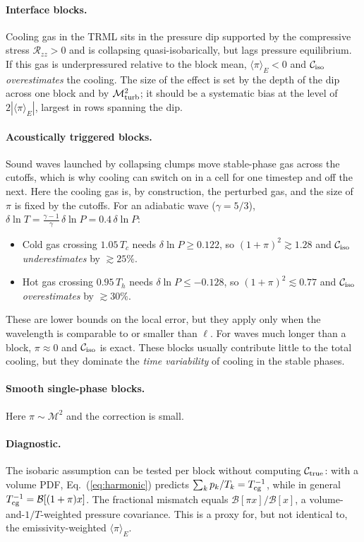 \documentclass[11pt]{article}
\newcommand{\B}{\mathcal{B}}
\newcommand{\Ctrue}{\mathcal{C}_{\rm true}}
\newcommand{\Ciso}{\mathcal{C}_{\rm iso}}
\newcommand{\Tcg}{T_{\rm cg}}
\begin{document}
\paragraph{Interface blocks.} Cooling gas in the TRML sits in the pressure dip supported by the compressive stress $\mathcal R_{zz}>0$ and is collapsing quasi-isobarically, but lags pressure equilibrium. If this gas is underpressured relative to the block mean, $\langle\pi\rangle_E<0$ and $\Ciso$ \emph{overestimates} the cooling. The size of the effect is set by the depth of the dip across one block and by $\mathcal M_{\rm turb}^2$; it should be a systematic bias at the level of $2|\langle\pi\rangle_E|$, largest in rows spanning the dip.

\paragraph{Acoustically triggered blocks.} Sound waves launched by collapsing clumps move stable-phase gas across the cutoffs, which is why cooling can switch on in a cell for one timestep and off the next. Here the cooling gas is, by construction, the perturbed gas, and the size of $\pi$ is fixed by the cutoffs. For an adiabatic wave ($\gamma=5/3$), $\delta\ln T=\tfrac{\gamma-1}{\gamma}\,\delta\ln P=0.4\,\delta\ln P$:
\begin{itemize}
\item Cold gas crossing $1.05\,T_c$ needs $\delta\ln P\ge0.122$, so $(1+\pi)^2\gtrsim1.28$ and $\Ciso$ \emph{underestimates} by $\gtrsim25\%$.
\item Hot gas crossing $0.95\,T_h$ needs $\delta\ln P\le-0.128$, so $(1+\pi)^2\lesssim0.77$ and $\Ciso$ \emph{overestimates} by $\gtrsim30\%$.
\end{itemize}
These are lower bounds on the local error, but they apply only when the wavelength is comparable to or smaller than $\ell$. For waves much longer than a block, $\pi\approx0$ and $\Ciso$ is exact. These blocks usually contribute little to the total cooling, but they dominate the \emph{time variability} of cooling in the stable phases.

\paragraph{Smooth single-phase blocks.} Here $\pi\sim\mathcal M^2$ and the correction is small.

\paragraph{Diagnostic.} The isobaric assumption can be tested per block without computing $\Ctrue$: with a volume PDF, Eq.~(\ref{eq:harmonic}) predicts $\sum_kp_k/T_k=\Tcg^{-1}$, while in general $\Tcg^{-1}=\B[(1+\pi)x]$. The fractional mismatch equals $\B[\pi x]/\B[x]$, a volume-and-$1/T$-weighted pressure covariance. This is a proxy for, but not identical to, the emissivity-weighted $\langle\pi\rangle_E$.
\end{document}
